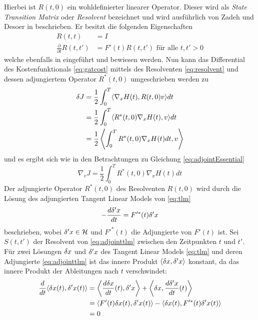 Hierbei ist $R(t,0)$ ein wohldefinierter linearer Operator. Dieser wird als \textit{State Transition Matrix} oder \textit{Resolvent} bezeichnet und wird ausführlich von Zadeh und Desoer in \cite[S. 339 ff.]{zadeh1976linear} beschrieben. Er besitzt die folgenden Eigenschaften
\begin{align}
  R(t,t) &= I \label{eq:resolventPropertiesA}\\
  \frac{\partial}{\partial t}R(t,t') &= F'(t)R(t,t') \text{ für alle } t,t'>0\label{eq:resolventPropertiesB}
\end{align}
welche ebenfalls in \cite[S. 339 Theorem 4]{zadeh1976linear} eingeführt und bewiesen werden.
Nun kann das Differential des Kostenfunktionals \eqref{eq:gatcost} mittels des Resolventen \eqref{eq:resolvent} und dessen adjungiertem Operator $R^*(t,0)$ umgeschrieben werden zu
\begin{equation*}
\begin{aligned}
 \delta J &= \frac{1}{2}\int_0^T \langle \nabla_x H(t), R(t,0)v\rangle dt \\
	    &= \frac{1}{2}\int_0^T \langle R^*(t,0) \nabla_x H(t), v\rangle dt \\
	    &= \frac{1}{2}\left\langle \int_0^T R^*(t,0) \nabla_x H(t) dt, v\right\rangle \\
\end{aligned}
\end{equation*}
und es ergibt sich wie in den Betrachtungen zu Gleichung \eqref{eq:adjointEssential} %
\begin{equation}
\label{eq:gradCostFunctional}
 \nabla_v J =\frac{1}{2} \int_0^T R^*(t,0) \nabla_x H(t) dt
\end{equation}
Der adjungierte Operator $R^*(t,0)$ des Resolventen $R(t,0)$ wird durch die Lösung des adjungierten Tangent Linear Models von \eqref{eq:tlm} 
\begin{equation}
\label{eq:adjointtlm}
 -\frac{d \delta'x}{dt} = F'^*(t)\delta'x
\end{equation}
beschrieben, wobei $\delta'x \in\mathcal{H}$ und $F'^*(t)$ die Adjungierte von $F'(t)$ ist. 
Sei $S(t,t')$ der Resolvent von \eqref{eq:adjointtlm} zwischen den Zeitpunkten $t$ und $t'$. Für zwei Lösungen $\delta x$ und $\delta' x$ des Tangent Linear Models \eqref{eq:tlm} und deren Adjungierte \eqref{eq:adjointtlm} ist das innere Produkt $\langle \delta x,\delta' x\rangle$ konstant, da das innere Produkt der Ableitungen nach $t$ verschwindet:
\begin{equation}
\begin{aligned}
 \frac{d}{dt}\langle \delta x(t),\delta' x(t)\rangle  &= \left\langle \frac{d \delta x}{dt}(t) ,\delta' x\right\rangle +\left\langle \delta x,\frac{d\delta ' x}{dt}(t)\right\rangle \\
 &= \langle F'(t)\delta x(t),\delta 'x(t)\rangle - \langle \delta x(t),F'^*(t)\delta' x(t)\rangle\\
 &= 0
\end{aligned}
\end{equation}
